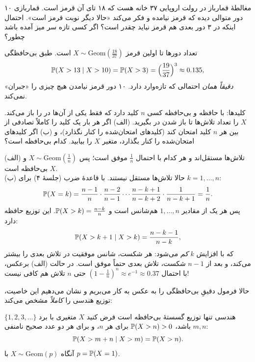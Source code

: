 \begin{example}[label=ex:roulette]{مغالطهٔ قمارباز}
در رولت اروپایی ۳۷ خانه هست که ۱۸ تای آن قرمز است. قماربازی ۱۰ دور متوالی دیده که قرمز نیامده و فکر می‌کند «حالا دیگر نوبت قرمز است». احتمال اینکه در ۳ دور بعدی هم قرمز نیاید چقدر است؟ اگر کسی تازه سر میز آمده باشد چطور؟
\begin{solution}
تعداد دورها تا اولین قرمز $X\sim\mathrm{Geom}(\tfrac{18}{37})$ است. طبق بی‌حافظگی
\[ \P(X>13\mid X>10)=\P(X>3)=\Bigl(\frac{19}{37}\Bigr)^3\approx0.135, \]
\emph{دقیقاً همان} احتمالی که تازه‌وارد دارد. ۱۰ دور قرمز نیامدن هیچ چیزی را «جبران» نمی‌کند.
\end{solution}
\end{example}


\begin{example}[label=ex:keys]{کلیدها: با حافظه و بی‌حافظه}
کسی $n$ کلید دارد که فقط یکی از آن‌ها در را باز می‌کند. $X$ را تعداد تلاش‌ها تا باز شدن در بگیرید. (الف) اگر هر بار یک کلید را کاملاً تصادفی از بین هر $n$ کلید امتحان کند (کلیدهای امتحان‌شده را کنار نگذارد)، و (ب) اگر کلیدهای امتحان‌شده را کنار بگذارد،  متغیر $X$ را بیابید. کدام بی‌حافظه است؟
\begin{solution}
(الف) تلاش‌ها مستقل‌اند و هر کدام با احتمال $\tfrac1n$ موفق است؛ پس $X\sim\mathrm{Geom}(\tfrac1n)$ و $X$ بی‌حافظه است.\\
(ب) حالا تلاش‌ها مستقل نیستند. با قاعدهٔ ضرب (جلسهٔ ۴) برای $k=1,\dots,n$:
\[ \P(X=k)=\frac{n-1}{n}\cdot\frac{n-2}{n-1}\cdots\frac{n-k+1}{n-k+2}\cdot\frac{1}{n-k+1}=\frac1n. \]
پس هر یک از مقادیر $1,\dots,n$ هم‌شانس است و $\P(X>k)=\frac{n-k}{n}$. این توزیع حافظه دارد:
\[ \P(X>k+1\mid X>k)=\frac{n-k-1}{n-k}, \]
که با افزایش $k$ \emph{کم} می‌شود: هر شکست، شانس موفقیت در تلاش بعدی را بیشتر می‌کند، و بعد از $n-1$ شکست، تلاش بعدی حتماً موفق است. در حالت (الف) برعکس، با احتمال $(1-\frac1n)^n\approx e^{-1}\approx0.37$ حتی $n$ تلاش هم کافی نیست!
\end{solution}
\end{example}

حالا فرمول دقیقِ بی‌حافظگی را به عکس به کار می‌بریم و نشان می‌دهیم این خاصیت، توزیع هندسی را \emph{کاملاً} مشخص می‌کند:

\begin{theorem}[label=thm:memoryless-unique]{هندسی تنها توزیع گسستهٔ بی‌حافظه است}
فرض کنید $X$ متغیری با برد $\{1,2,3,\dots\}$ باشد، $\P(X>n)>0$ برای هر $n$، و برای هر دو عدد صحیح نامنفی $m,n$:
\[ \P(X>m+n\mid X>m)=\P(X>n). \]
آنگاه $X\sim\mathrm{Geom}(p)$ با $p=\P(X=1)$.
\end{theorem}

